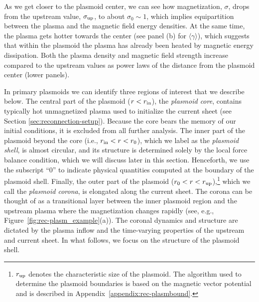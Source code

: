 As we get closer to the plasmoid center, we can see how magnetization, $\sigma$, drops from the upstream value, $\sigma_{\rm up}$, to about $\sigma_0\sim 1$, which implies equipartition between the plasma and the magnetic field energy densities. At the same time, the plasma gets hotter towards the center (see panel (b) for $\langle\gamma\rangle$), which suggests that within the plasmoid the plasma has already been heated by magnetic energy dissipation. Both the plasma density and magnetic field strength increase compared to the upstream values as power laws of the distance from the plasmoid center (lower panels).

In primary plasmoids we can identify three regions of interest that we describe below. The central part of the plasmoid ($r < r_{\rm in}$), the {\it plasmoid core}, contains typically hot unmagnetized plasma used to initialize the current sheet (see Section \ref{sec:reconnection-setup}). Because the core bears the memory of our initial conditions, it is excluded from all further analysis. The inner part of the plasmoid beyond the core (i.e., $r_{\rm in} < r < r_0$), which we label as the {\it plasmoid shell}, is almost circular, and its structure is determined solely by the local force balance condition, which we will discuss later in this section. Henceforth, we use the subscript ``$0$'' to indicate physical quantities computed at the boundary of the plasmoid shell. Finally, the outer part of the plasmoid ($r_0 < r < r_{\rm up}$),\footnote{$r_{\rm up}$ denotes the characteristic size of the plasmoid. The algorithm used to determine the plasmoid boundaries is based on the magnetic vector potential and is described in Appendix~\ref{appendix:rec-plasmbound}.} which we call the {\it plasmoid corona}, is elongated along the current sheet. The corona can be thought of as a transitional layer between the inner plasmoid region and the upstream plasma where the magnetization changes rapidly (see, e.g., Figure~\ref{fig:rec-plasm_example}(a)). The coronal dynamics and structure are dictated by the plasma inflow and the time-varying properties of the upstream and current sheet. In what follows, we focus on the structure of the plasmoid shell.


